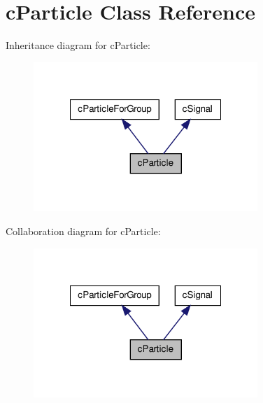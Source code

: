 \hypertarget{classc_particle}{
\section{cParticle Class Reference}
\label{classc_particle}
}


Inheritance diagram for cParticle:
\nopagebreak
\begin{figure}[H]
\begin{center}
\leavevmode
\includegraphics[width=240pt]{classc_particle__inherit__graph}
\end{center}
\end{figure}


Collaboration diagram for cParticle:
\nopagebreak
\begin{figure}[H]
\begin{center}
\leavevmode
\includegraphics[width=240pt]{classc_particle__coll__graph}
\end{center}
\end{figure}

